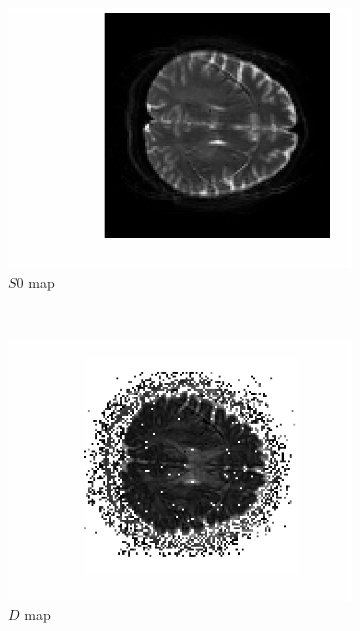 \documentclass[11pt,a4paper,oneside]{report}
\begin{document}
\begin{figure}[H]
  \centering
  \begin{subfigure}[b]{0.5\textwidth}
      \centering
    \includegraphics[scale=1]{figures/q1/q114-S0.eps}
    \caption{$S0$ map}
    \label{q114-S0}
  \end{subfigure}%
  ~
  \begin{subfigure}[b]{0.5\textwidth}
      \centering
    \includegraphics[scale=1]{figures/q1/q114-D.eps}
    \caption{$D$ map}
    \label{q114-D}
  \end{subfigure}%
  \caption{}

\end{figure}
\end{document}
